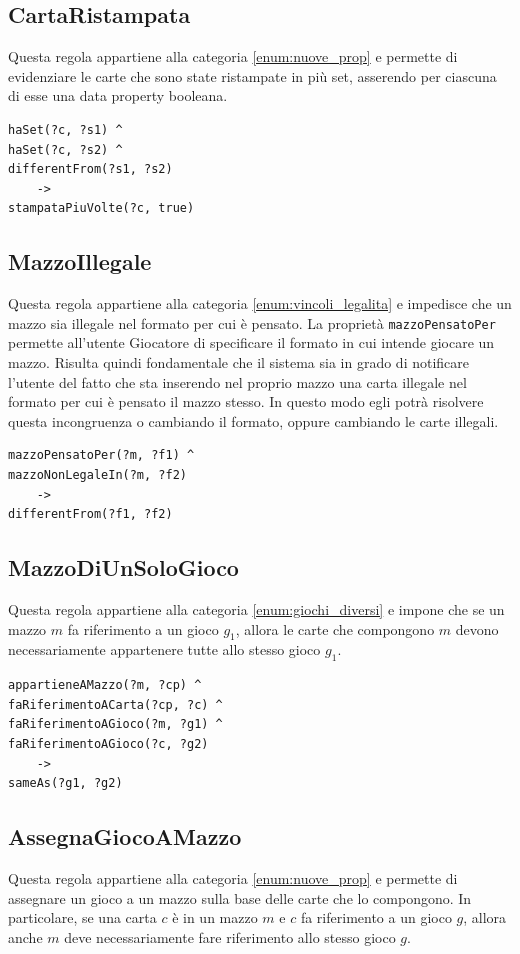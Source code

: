 \documentclass[12pt]{article}
\begin{document}
\subsection{CartaRistampata}
Questa regola appartiene alla categoria \ref{enum:nuove_prop} e permette di evidenziare le carte che sono state ristampate in più set, asserendo per ciascuna di esse una data property booleana.
\begin{lstlisting}[language=SPARQL]
haSet(?c, ?s1) ^ 
haSet(?c, ?s2) ^ 
differentFrom(?s1, ?s2) 
    -> 
stampataPiuVolte(?c, true)
\end{lstlisting}


\subsection{MazzoIllegale}
Questa regola appartiene alla categoria \ref{enum:vincoli_legalita} e impedisce che un mazzo sia illegale nel formato per cui è pensato. La proprietà \lstinline [language=SPARQL]{mazzoPensatoPer} permette all'utente Giocatore di specificare il formato in cui intende giocare un mazzo. Risulta quindi fondamentale che il sistema sia in grado di notificare l'utente del fatto che sta inserendo nel proprio mazzo una carta illegale nel formato per cui è pensato il mazzo stesso. In questo modo egli potrà risolvere questa incongruenza o cambiando il formato, oppure cambiando le carte illegali.

\begin{lstlisting}[language=SPARQL]
mazzoPensatoPer(?m, ?f1) ^ 
mazzoNonLegaleIn(?m, ?f2) 
    -> 
differentFrom(?f1, ?f2)
\end{lstlisting}

\subsection{MazzoDiUnSoloGioco}
Questa regola appartiene alla categoria \ref{enum:giochi_diversi} e impone che se un mazzo $m$ fa riferimento a un gioco $g_1$, allora le carte che compongono $m$ devono necessariamente appartenere tutte allo stesso gioco $g_1$.
\begin{lstlisting}[language=SPARQL]
appartieneAMazzo(?m, ?cp) ^ 
faRiferimentoACarta(?cp, ?c) ^ 
faRiferimentoAGioco(?m, ?g1) ^ 
faRiferimentoAGioco(?c, ?g2) 
    -> 
sameAs(?g1, ?g2)
\end{lstlisting}

\subsection{AssegnaGiocoAMazzo}
Questa regola appartiene alla categoria \ref{enum:nuove_prop} e permette di assegnare un gioco a un mazzo sulla base delle carte che lo compongono. In particolare, se una carta $c$ è in un mazzo $m$ e $c$ fa riferimento a un gioco $g$, allora anche $m$ deve necessariamente fare riferimento allo stesso gioco $g$.
\end{document}
